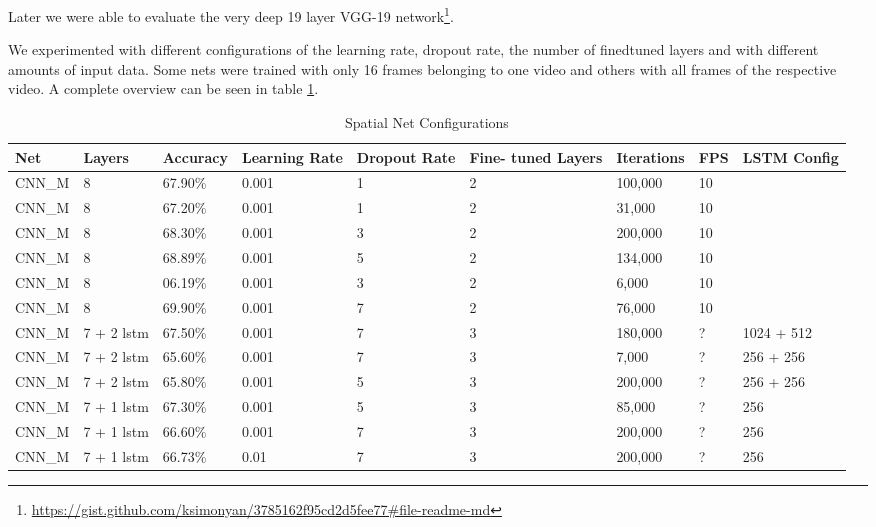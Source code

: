 Later we were able to evaluate the very deep 19 layer VGG-19 \cite{simonyan2014very} network\footnote{\url{https://gist.github.com/ksimonyan/3785162f95cd2d5fee77\#file-readme-md}}.

We experimented with different configurations of the learning rate, dropout rate, the number of finedtuned layers and with different amounts of input data. Some nets were trained with only 16 frames belonging to one video and others with all frames of the respective video. A complete overview can be seen in table \ref{table:spatial_results}.

\begin{table}[H]
\centering
\caption{Spatial Net Configurations}
\label{table:spatial_results}
\begin{tabularx}{\textwidth}{XXXXXXXXX}
\toprule
Net & Layers & Accuracy	& Learning Rate & Dropout Rate & Fine- tuned Layers	& Iterations	& FPS & LSTM Config \\ \midrule

CNN\_M & 8          & 67.90\% & 0.001 & 1 & 2 & 100,000 & 10 & \\
CNN\_M & 8          & 67.20\% & 0.001 & 1 & 2 &  31,000 & 10 & \\
CNN\_M & 8          & 68.30\% & 0.001 & 3 & 2 & 200,000 & 10 & \\
CNN\_M & 8          & 68.89\% & 0.001 & 5 & 2 & 134,000 & 10 & \\
CNN\_M & 8          & 06.19\% & 0.001 & 3 & 2 &   6,000 & 10 & \\
CNN\_M & 8          & 69.90\% & 0.001 & 7 & 2 &  76,000 & 10 & \\
CNN\_M & 7 + 2 lstm & 67.50\% & 0.001 & 7 & 3 & 180,000 & ?  & 1024 + 512 \\
CNN\_M & 7 + 2 lstm & 65.60\% & 0.001 & 7 & 3 &   7,000 & ?  & 256 + 256 \\
CNN\_M & 7 + 2 lstm & 65.80\% & 0.001 & 5 & 3 & 200,000 & ?  & 256 + 256 \\
CNN\_M & 7 + 1 lstm & 67.30\% & 0.001 & 5 & 3 &  85,000 & ?  & 256 \\
CNN\_M & 7 + 1 lstm & 66.60\% & 0.001 & 7 & 3 & 200,000 & ?  & 256 \\
CNN\_M & 7 + 1 lstm & 66.73\% &  0.01 & 7 & 3 & 200,000 & ?  & 256 \\

\bottomrule
\end{tabularx}
\end{table}

